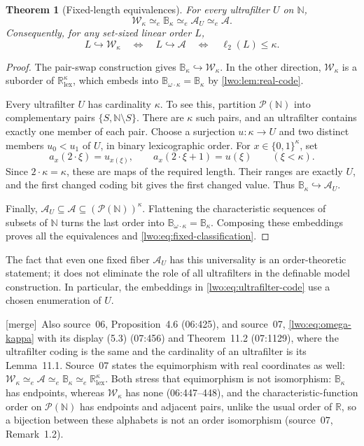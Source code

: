 \documentclass[11pt,a4paper]{article}
\newtheorem{theorem}{Theorem}[section]
\theoremstyle{definition}
\theoremstyle{remark}
\newcommand{\R}{\mathbb R}
\newcommand{\N}{\mathbb N}
\newcommand{\W}{\mathcal W}
\newcommand{\A}{\mathcal A}
\newcommand{\B}{\mathbb B}
\newcommand{\two}{\{0,1\}}
\newcommand{\lex}{\mathrm{lex}}
\newcommand{\bl}{\ell_2}
\newcommand{\emb}{\hookrightarrow}
\newcommand{\equi}{\mathrel{\simeq_{\!e}}}
\newcommand{\merge}{\textsf{[merge]}}
\begin{document}
\begin{theorem}[Fixed-length equivalences]\label{lwo:thm:fixed-equivalence}
For every ultrafilter $U$ on $\N$,
\[
                 \W_\kappa\equi\B_\kappa\equi\A_U\equi\A.
\]
Consequently, for any set-sized linear order $L$,
\begin{equation}\label{lwo:eq:fixed-classification}
 L\emb\W_\kappa
 \quad\Longleftrightarrow\quad L\emb\A
 \quad\Longleftrightarrow\quad\bl(L)\leq\kappa.
\end{equation}
\end{theorem}
\begin{proof}
The pair-swap construction gives $\B_\kappa\emb\W_\kappa$. In the other
direction, $\W_\kappa$ is a suborder of $\R^\kappa_{\lex}$, which embeds
into $\B_{\omega\cdot\kappa}=\B_\kappa$ by \cref{lwo:lem:real-code}.

Every ultrafilter $U$ has cardinality $\kappa$. To see this, partition
$\mathcal P(\N)$ into complementary pairs $\{S,\N\setminus S\}$.
There are $\kappa$ such pairs, and an ultrafilter contains exactly one
member of each pair. Choose a surjection $u:\kappa\to U$ and two distinct
members $u_0<u_1$ of $U$, in binary lexicographic order. For
$x\in\two^\kappa$, set
\begin{equation}\label{lwo:eq:ultrafilter-code}
 a_x(2\cdot\xi)=u_{x(\xi)},\qquad
 a_x(2\cdot\xi+1)=u(\xi)\qquad(\xi<\kappa).
\end{equation}
Since $2\cdot\kappa=\kappa$, these are maps of the required length. Their
ranges are exactly $U$, and the first changed coding bit gives the first
changed value. Thus $\B_\kappa\emb\A_U$.

Finally, $\A_U\subseteq\A\subseteq(\mathcal P(\N))^\kappa$.
Flattening the characteristic sequences of subsets of $\N$ turns the last
order into $\B_{\omega\cdot\kappa}=\B_\kappa$. Composing these embeddings
proves all the equivalences and \eqref{lwo:eq:fixed-classification}.
\end{proof}

The fact that even one fixed fiber $\A_U$ has this universality is an
order-theoretic statement; it does not eliminate the role of all ultrafilters
in the definable model construction. In particular, the embeddings in
\eqref{lwo:eq:ultrafilter-code} use a chosen enumeration of $U$.

\merge\ Also source~06, Proposition~4.6 (06:425), and source~07,
\eqref{lwo:eq:omega-kappa} with its display (5.3) (07:456) and Theorem~11.2
(07:1129), where the ultrafilter coding is the same and the cardinality of an
ultrafilter is its Lemma~11.1. Source~07 states the equimorphism with real
coordinates as well: $\W_\kappa\equi\A\equi\B_\kappa\equi\R^\kappa_{\lex}$.
Both stress that equimorphism is not isomorphism: $\B_\kappa$ has endpoints,
whereas $\W_\kappa$ has none (06:447--448), and the characteristic-function
order on $\mathcal P(\N)$ has endpoints and adjacent pairs, unlike the usual
order of $\R$, so a bijection between these alphabets is not an order
isomorphism (source~07, Remark~1.2).
\end{document}

